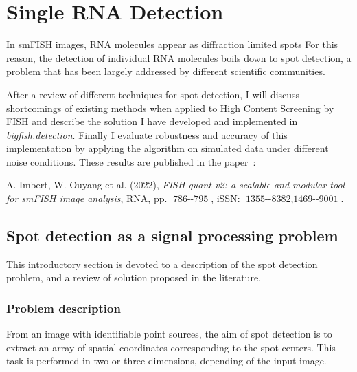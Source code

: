 
\graphicspath{{./figures/chapter2/}}

\chapter{Single RNA Detection}
\label{ch:chapter2}

\minitoc
\newpage

In \ac{smFISH} images, \ac{RNA} molecules appear as diffraction limited spots
For this reason, the detection of individual \ac{RNA} molecules boils down to spot detection, a problem that has been largely addressed by different scientific communities.

After a review of different techniques for spot detection, I will discuss shortcomings of existing methods when applied to High Content Screening by \ac{FISH} and describe the solution I have developed and implemented in \mbox{\emph{bigfish.detection}}.
Finally I evaluate robustness and accuracy of this implementation by applying the algorithm on simulated data under different noise conditions.
These results are published in the paper~\cite{Imbert_fq_2022}:

\begin{center}
	\color{green}
	A. Imbert, W. Ouyang et al. (2022), \textit{FISH-quant v2: a scalable and modular tool for smFISH image analysis}, RNA, pp. $\operatorname{786--795}$, iSSN: $\operatorname{1355--8382, 1469--9001}$.
\end{center}

\section{Spot detection as a signal processing problem}
\label{sec:detection_introduction}

This introductory section is devoted to a description of the spot detection problem, and a review of solution proposed in the literature.  

\subsection{Problem description}
\label{subsec:detection}

From an image with identifiable point sources, the aim of spot detection is to extract an array of spatial coordinates corresponding to the spot centers.
This task is performed in two or three dimensions, depending of the input image.\\


